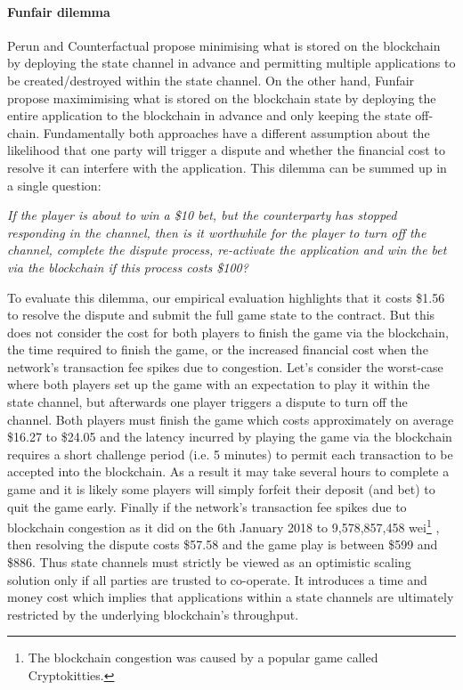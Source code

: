 \documentclass{llncs}
\begin{document}
\paragraph{Funfair dilemma} 
Perun and Counterfactual propose minimising what is stored on the blockchain by deploying the state channel in advance and permitting multiple applications to be created/destroyed within the state channel. 
On the other hand, Funfair propose maximimising what is stored on the blockchain state by deploying the entire application to the blockchain in advance and only keeping the state off-chain. 
Fundamentally both approaches have a different assumption about the likelihood that one party will trigger a dispute and whether the financial cost to resolve it can interfere with the application. 
This dilemma can be summed up in a single question:

\begin{center}
\textit{If the player is about to win a \$10 bet, but the counterparty has stopped responding in the channel, then is it worthwhile for the player to turn off the channel, complete the dispute process, re-activate the application and win the bet via the blockchain if this process costs \$100?} 
\end{center} 

To evaluate this dilemma, our empirical evaluation highlights that it costs \$1.56 to resolve the dispute and submit the full game state to the contract.
But this does not consider the cost for both players to finish the game via the blockchain, the time required to finish the game, or the increased financial cost when the network's transaction fee spikes due to congestion. %
Let's consider the worst-case where both players set up the game with an expectation to play it within the state channel, but afterwards one player triggers a dispute to turn off the channel. 
Both players must finish the game which costs approximately on average \$16.27 to \$24.05 and the latency incurred by playing the game via the blockchain requires a short challenge period (i.e. 5 minutes) to permit each transaction to be accepted into the blockchain. 
As a result it may take several hours to complete a game and it is likely some players will simply forfeit their deposit (and bet) to quit the game early. 
Finally if the network's transaction fee spikes due to blockchain congestion as it did on the 6th January 2018 to 9,578,857,458 wei\footnote{The blockchain congestion was caused by a popular game called Cryptokitties.}  \cite{etherscan}, then resolving the dispute costs \$57.58 and the game play is between \$599 and \$886.  %
Thus state channels must strictly be viewed as an optimistic scaling solution only if all parties are trusted to co-operate. 
It introduces a time and money cost which implies that applications within a state channels are ultimately restricted by the underlying blockchain's throughput. 
\end{document}
